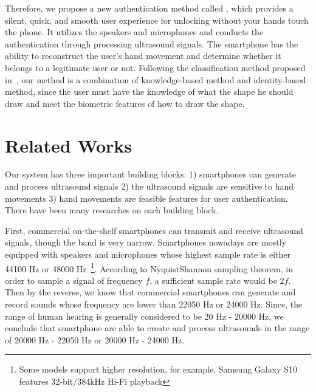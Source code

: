 Therefore, we propose a new authentication method called {\uu}, which provides a silent, quick, and smooth user experience for unlocking without your hands touch the phone. It utilizes the speakers and microphones and conducts the authentication through processing ultrasound signals. The smartphone has the ability to reconstruct the user’s hand movement and determine whether it belongs to a legitimate user or not. Following the classification method proposed in~\cite{vongsingthong2015survey}, our method is a combination of knowledge-based method and identity-based method, since the user must have the knowledge of what the shape he should draw and meet the biometric features of how to draw the shape.

\section{Related Works}
Our {\uu} system has three important building blocks: 1) smartphones can generate and process ultrasound signals 2) the ultrasound signals are sensitive to hand movements 3) hand movements are feasible features for user authentication. There have been many researches on each  building block.

First, commercial on-the-shelf smartphones can transmit and receive ultrasound signals, though the band is very narrow. Smartphones nowadays are mostly equipped with speakers and microphones whose highest sample rate is either 44100 Hz or 48000 Hz~\footnote{Some models support higher resolution, for example, Samsung Galaxy S10 features 32-bit/384kHz Hi-Fi playback}. According to NyquistShannon sampling theorem, in order to sample a signal of frequency $f$, a sufficient sample rate would be $2f$. Then by the reverse, we know that commercial smartphones can generate and record sounds whose frequency are lower than 22050 Hz or 24000 Hz. Since, the range of human hearing is generally considered to be 20 Hz - 20000 Hz, we conclude that smartphone are able to create and process ultrasounds in the range of 20000 Hz - 22050 Hz or 20000 Hz - 24000 Hz.

